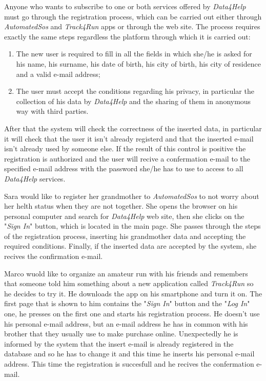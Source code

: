 Anyone who wants to subscribe to one or both services offered by \textit{Data4Help} must go through the registration process, which can be carried out either through \textit{AutomatedSos} and \textit{Track4Run} apps or through the web site.
The process requires exactly the same steps regardless the platform through which it is carried out:
\begin{enumerate}
  \item The new user is required to fill in all the fields in which she/he is asked for his name, his surname, his date of birth, his city of birth, his city of residence and a valid e-mail address;
  \item The user must accept the conditions regarding his privacy, in particular the collection of his data by \textit{Data4Help} and the sharing of them in anonymous way with third parties.
\end{enumerate}
After that the system will check the correctness of the inserted data, in particular it will check that the user it isn't already registerd and that the inserted e-mail isn't already used by someone else. If the result of this control is positive the registration is authorized and the user will recive a confermation e-mail to the specified e-mail address with the password she/he has to use to access to all \textit{Data4Help} services.

Sara would like to register her grandmother to \textit{AutomatedSos} to not worry about her helth status when they are not together. She opens the browser on his personal computer and search for \textit{Data4Help} web site, then she clicks on the "\textit{Sign In}" button, which is located in the main page. She passes through the steps of the registration process, inserting his grandmother data and accepting the required conditions. Finally, if the inserted data are accepted by the system, she recives the confirmation e-mail.

Marco wuold like to organize an amateur run with his friends and remembers that someone told him something about a new application called \textit{Track4Run} so he decides to try it. He downloads the app on his smartphone and turn it on. The first page that is shown to him contains the "\textit{Sign In}" button and the "\textit{Log In}" one, he presses on the first one and starts his registration process. He doesn't use his personal e-mail address, but an e-mail address he has in common with his brother that they usually use to make purchase online. Unexpectedly he is informed by the system that the insert e-mail is already registered in the database and so he has to change it and this time he inserts his personal e-mail address. This time the registration is succesfull and he recives the confermation e-mail.

